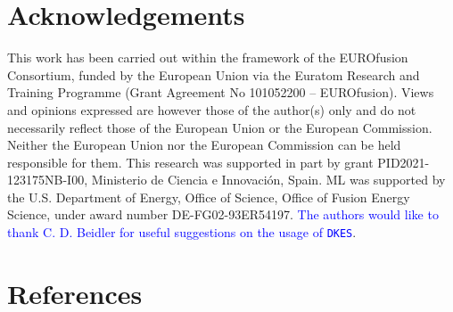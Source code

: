 \documentclass[10pt]{iopart}
\newcommand{\DKES}{{\texttt{DKES}}}
\begin{document}
\section*{Acknowledgements}
This work has been carried out within the framework of the EUROfusion Consortium, funded by the European Union via the Euratom Research and Training Programme (Grant Agreement No 101052200 – EUROfusion). Views and opinions expressed are however those of the author(s) only and do not necessarily reflect those of the European Union or the European Commission. Neither the European Union nor the European Commission can be held responsible for them. This research was supported in part by grant PID2021-123175NB-I00, Ministerio de Ciencia e Innovación, Spain. 
ML was supported by the U.S. Department of Energy, Office of Science, Office of Fusion Energy Science, under award number DE-FG02-93ER54197. \textcolor{blue}{The authors would like to thank C. D. Beidler for useful suggestions on the usage of {\DKES}}.


\section*{References}

{}
\end{document}
